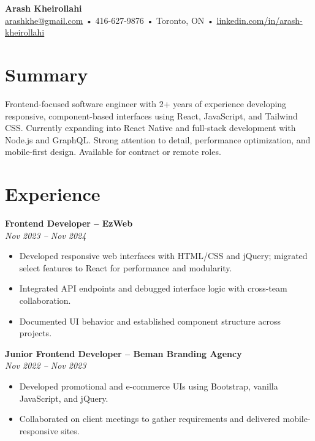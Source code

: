 \documentclass[letterpaper,11pt]{article}
\begin{document}

{\LARGE \textbf{Arash Kheirollahi}}\\
\href{mailto:arashkhe@gmail.com}{arashkhe@gmail.com} • 416-627-9876 • Toronto, ON • \href{https://linkedin.com/in/arash-kheirollahi}{linkedin.com/in/arash-kheirollahi}

\vspace{1.2em}

\section*{Summary}
Frontend-focused software engineer with 2+ years of experience developing responsive, component-based interfaces using React, JavaScript, and Tailwind CSS. Currently expanding into React Native and full-stack development with Node.js and GraphQL. Strong attention to detail, performance optimization, and mobile-first design. Available for contract or remote roles.

\vspace{0.6em}

\section*{Experience}
\textbf{Frontend Developer – EzWeb}\\
\textit{Nov 2023 -- Nov 2024}\\
\begin{itemize}[leftmargin=*]
  \item Developed responsive web interfaces with HTML/CSS and jQuery; migrated select features to React for performance and modularity.
  \item Integrated API endpoints and debugged interface logic with cross-team collaboration.
  \item Documented UI behavior and established component structure across projects.
\end{itemize}

\vspace{0.6em}

\textbf{Junior Frontend Developer – Beman Branding Agency}\\
\textit{Nov 2022 -- Nov 2023}\\
\begin{itemize}[leftmargin=*]
  \item Developed promotional and e-commerce UIs using Bootstrap, vanilla JavaScript, and jQuery.
  \item Collaborated on client meetings to gather requirements and delivered mobile-responsive sites.
\end{itemize}
\end{document}
